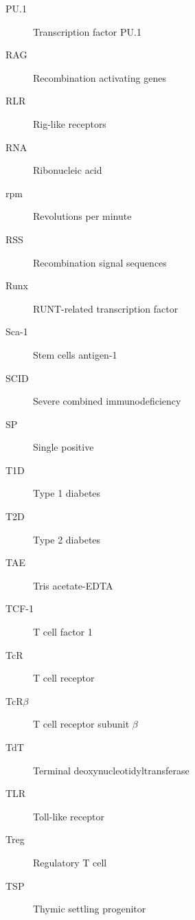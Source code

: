 \begin{description}
\item[PU.1]
Transcription factor PU.1

\item[RAG]
Recombination activating genes

\item[RLR]
Rig-like receptors

\item[RNA]
Ribonucleic acid

\item[rpm]
Revolutions per minute

\item[RSS]
Recombination signal sequences

\item[Runx]
RUNT-related transcription factor

\item[Sca-1]
Stem cells antigen-1

\item[SCID]
Severe combined immunodeficiency

\item[SP]
Single positive

\item[T1D]
Type 1 diabetes

\item[T2D]
Type 2 diabetes

\item[TAE]
Tris acetate-EDTA

\item[TCF-1]
T cell factor 1

\item[TcR]
T cell receptor

\item[TcR$\beta$]
T cell receptor subunit $\beta$

\item[TdT]
Terminal deoxynucleotidyltransferase

\item[TLR]
Toll-like receptor

\item[Treg]
Regulatory T cell

\item[TSP]
Thymic settling progenitor

\end{description}